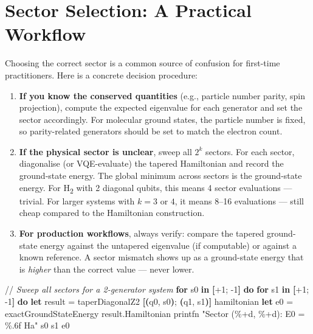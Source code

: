 \documentclass[
  11pt,
  oneside]{book}
\newenvironment{Shaded}{\begin{snugshade}}{\end{snugshade}}
\newcommand{\CommentTok}[1]{\textcolor[rgb]{0.56,0.35,0.01}{\textit{#1}}}
\newcommand{\DecValTok}[1]{\textcolor[rgb]{0.00,0.00,0.81}{#1}}
\newcommand{\KeywordTok}[1]{\textcolor[rgb]{0.13,0.29,0.53}{\textbf{#1}}}
\newcommand{\NormalTok}[1]{#1}
\newcommand{\OperatorTok}[1]{\textcolor[rgb]{0.81,0.36,0.00}{\textbf{#1}}}
\newcommand{\StringTok}[1]{\textcolor[rgb]{0.31,0.60,0.02}{#1}}
\begin{document}
\section{Sector Selection: A Practical
Workflow}\label{sector-selection-a-practical-workflow}

Choosing the correct sector is a common source of confusion for
first-time practitioners. Here is a concrete decision procedure:

\begin{enumerate}
\def\labelenumi{\arabic{enumi}.}
\item
  \textbf{If you know the conserved quantities} (e.g., particle number
  parity, spin projection), compute the expected eigenvalue for each
  generator and set the sector accordingly. For molecular ground states,
  the particle number is fixed, so parity-related generators should be
  set to match the electron count.
\item
  \textbf{If the physical sector is unclear}, sweep all \(2^k\) sectors.
  For each sector, diagonalise (or VQE-evaluate) the tapered Hamiltonian
  and record the ground-state energy. The global minimum across sectors
  is the ground-state energy. For H\textsubscript{2} with 2 diagonal qubits, this means
  4 sector evaluations --- trivial. For larger systems with \(k = 3\) or
  \(4\), it means 8--16 evaluations --- still cheap compared to the
  Hamiltonian construction.
\item
  \textbf{For production workflows}, always verify: compare the tapered
  ground-state energy against the untapered eigenvalue (if computable)
  or against a known reference. A sector mismatch shows up as a
  ground-state energy that is \emph{higher} than the correct value ---
  never lower.
\end{enumerate}

\begin{Shaded}
\begin{Highlighting}[]
\NormalTok{//}\CommentTok{ Sweep all sectors for a 2{-}generator system}
\KeywordTok{for}\NormalTok{ s0 }\KeywordTok{in} \OperatorTok{[}\NormalTok{+}\DecValTok{1}\NormalTok{; }\DecValTok{{-}1}\OperatorTok{]} \KeywordTok{do}
    \KeywordTok{for}\NormalTok{ s1 }\KeywordTok{in} \OperatorTok{[}\NormalTok{+}\DecValTok{1}\NormalTok{; }\DecValTok{{-}1}\OperatorTok{]} \KeywordTok{do}
        \KeywordTok{let}\NormalTok{ result = taperDiagonalZ2 }\OperatorTok{[(}\NormalTok{q0, s0}\OperatorTok{)}\NormalTok{; }\OperatorTok{(}\NormalTok{q1, s1}\OperatorTok{)]}\NormalTok{ hamiltonian}
        \KeywordTok{let}\NormalTok{ e0 = exactGroundStateEnergy result.Hamiltonian}
\NormalTok{        printfn }\StringTok{"Sector (\%+d, \%+d): E0 = \%.6f Ha"}\NormalTok{ s0 s1 e0}
\end{Highlighting}
\end{Shaded}
\end{document}
